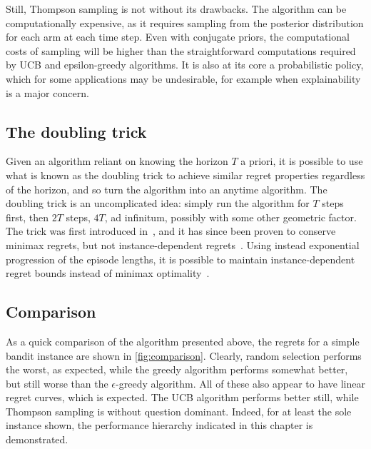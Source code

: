 Still, Thompson sampling is not without its drawbacks.
The algorithm can be computationally expensive, as it requires sampling from the posterior distribution for each arm at each time step.
Even with conjugate priors, the computational costs of sampling will be higher than the straightforward computations required by UCB and epsilon-greedy algorithms.
It is also at its core a probabilistic policy, which for some applications may be undesirable, for example when explainability is a major concern.

\subsection{The doubling trick}
Given an algorithm reliant on knowing the horizon $T$ a priori, it is possible to use what is known as the doubling trick to achieve similar regret properties regardless of the horizon, and so turn the algorithm into an anytime algorithm.
The doubling trick is an uncomplicated idea: simply run the algorithm for $T$ steps first, then $2T$ steps, $4T$, ad infinitum, possibly with some other geometric factor.
The trick was first introduced in~\autocite{auer1995}, and it has since been proven to conserve minimax regrets, but not instance-dependent regrets~\autocite{besson2018}.
Using instead exponential progression of the episode lengths, it is possible to maintain instance-dependent regret bounds instead of minimax optimality~\autocite{besson2018}.

\subsection{Comparison}
\label{sec:comparison}
As a quick comparison of the algorithm presented above, the regrets for a simple bandit instance are shown in \cref{fig:comparison}.
Clearly, random selection performs the worst, as expected, while the greedy algorithm performs somewhat better, but still worse than the $\epsilon$-greedy algorithm.
All of these also appear to have linear regret curves, which is expected.
The UCB algorithm performs better still, while Thompson sampling is without question dominant.
Indeed, for at least the sole instance shown, the performance hierarchy indicated in this chapter is demonstrated.

